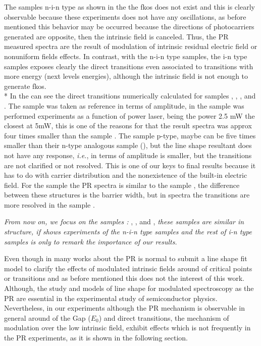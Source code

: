 The samples n-i-n type as shown in the  the \gls{fkos} does not exist and this is clearly observable because these experiments does not have any oscillations, as before mentioned this behavior may be occurred because the directions  of photocarriers generated are opposite, then the intrinsic field is canceled. Thus, the PR measured spectra are the result of modulation of intrinsic residual electric field or  nonuniform fields effects\cite{delsole1978effect}.  
In contrast,  with the n-i-n type samples, the i-n type samples exposes clearly the direct transitions even associated to transitions with more energy (next levels energies), although the intrinsic field is not enough to generate \gls{fkos}. \\*
In the  can see the direct transitions numerically calculated for samples , , ,  and . The sample  was taken as reference in terms of amplitude, in the sample  was performed experiments as a function of power laser, being the power 2.5 mW the closest at 5mW, this is one of the reasons for that the result spectra was approx four times smaller than the sample .   The sample  p-type, maybe can be five times smaller than their n-type analogous sample (), but the line shape resultant does not have any response, \textit{i.e.}, in terms of amplitude is smaller, but the transitions are not clarified or not resolved. This is one of our keys to final results because it has to do with carrier distribution and the nonexistence of the built-in electric field. For the sample  the PR spectra is similar to the sample  , the difference between these structures is the barrier width, but in spectra the transitions are more resolved in the sample .  

\emph{From now on, we focus on the samples :} , ,  and , \emph{these samples are similar in structure, if shows experiments of the n-i-n type samples and the rest of i-n type samples is only to remark the importance of our results. }

Even though in many works about the PR is normal to submit a line shape fit model  to clarify the effects of modulated intrinsic fields around of critical points or transitions and as before mentioned this does not the interest of this work. Although, the study and models of line shape for modulated spectroscopy as the PR are essential in the experimental study of semiconductor physics\cite{cardona1969modulation,seraphin1966bandstructure}.  Nevertheless, in our experiments  although the PR mechanism is observable in general around of the Gap ($E_0$) and direct transitions, the mechanism of modulation over the low intrinsic field, exhibit  effects  which is not frequently in the PR experiments, as it is shown in the following section. 


